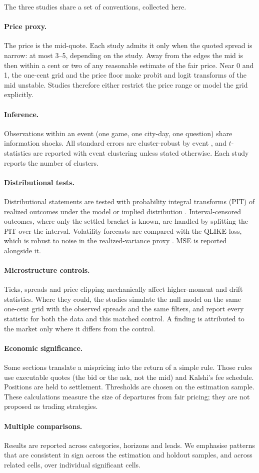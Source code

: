 The three studies share a set of conventions, collected here.

\paragraph{Price proxy.} The price is the mid-quote. Each study admits it only when the quoted
spread is narrow: at most 3--5\cents, depending on the study. Away from the edges the mid is then
within a cent or two of any reasonable estimate of the fair price. Near 0 and 1, the one-cent grid
and the price floor make probit and logit transforms of the mid unstable. Studies therefore either
restrict the price range or model the grid explicitly.

\paragraph{Inference.} Observations within an event (one game, one city-day, one question) share
information shocks. All standard errors are cluster-robust by event \citep{cameronmiller2015},
and $t$-statistics are reported with event clustering unless stated otherwise. Each study reports
the number of clusters.

\paragraph{Distributional tests.} Distributional statements are tested with probability integral
transforms (PIT) of realized outcomes under the model or implied distribution
\citep{diebold1998}. Interval-censored outcomes, where only the settled bracket is known, are
handled by splitting the PIT over the interval. Volatility forecasts are compared with the QLIKE
loss, which is robust to noise in the realized-variance proxy \citep{patton2011}. MSE is reported
alongside it.

\paragraph{Microstructure controls.} Ticks, spreads and price clipping mechanically affect
higher-moment and drift statistics. Where they could, the studies simulate the null model on the
same one-cent grid with the observed spreads and the same filters, and report every statistic for
both the data and this matched control. A finding is attributed to the market only where it differs
from the control.

\paragraph{Economic significance.} Some sections translate a mispricing into the return of a simple
rule. Those rules use executable quotes (the bid or the ask, not the mid) and Kalshi's fee schedule.
Positions are held to settlement. Thresholds are chosen on the estimation sample. These
calculations measure the size of departures from fair pricing; they are not proposed as trading
strategies.

\paragraph{Multiple comparisons.} Results are reported across categories, horizons and leads.
We emphasise patterns that are consistent in sign across the estimation and holdout samples, and
across related cells, over individual significant cells.
